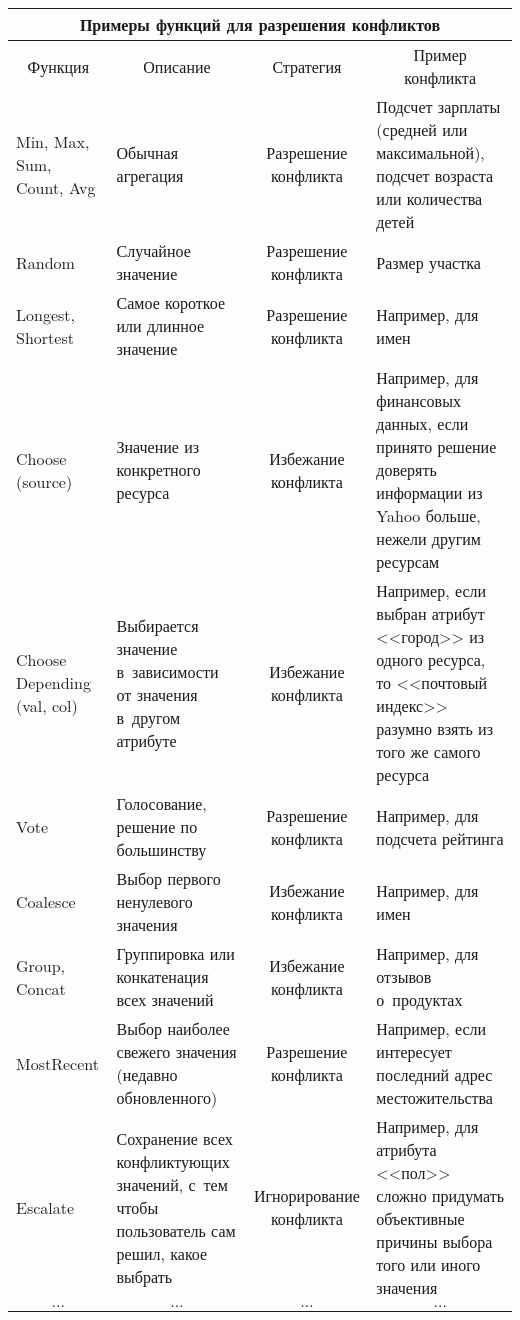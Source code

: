   \begin{table}\small
  \begin{center}

  \tabcolsep=5pt
  \begin{tabular}{|l|p{34mm}|c|p{40mm}|}
  \multicolumn{4}{c}{Примеры функций для разрешения конфликтов}\\[6pt]
  \hline
  \multicolumn{1}{|c|}{Функция}&\multicolumn{1}{c|}{Описание}&Стратегия&\multicolumn{1}{c|}{Пример
конфликта}\\
  \hline
Min, Max, Sum, Count, Avg&Обычная агрегация&Разрешение конфликта&Подсчет зарплаты
(средней или максимальной), подсчет возраста или количества детей\\
\hline
Random&Случайное значение&Разрешение конфликта&Размер участка\\
\hline
Longest, Shortest&Самое короткое или длинное значение&Разрешение
конфликта&Например, для имен\\
\hline
Choose (source)&Значение из конкретного ресурса&Избежание конфликта&Например, для
финансовых данных, если принято решение доверять информации из Yahoo больше, нежели
другим ресурсам\\
\hline
Choose Depending (val, col)&Выбирается значение в~зависимости от значения в~другом
атрибуте&Избежание конфликта&Например, если выбран атрибут <<город>> из одного
ресурса, то <<почтовый индекс>> разумно взять из того же самого ресурса\\
\hline
Vote&Голосование, решение по большинству&Разрешение конфликта&Например, для
подсчета рейтинга\\
\hline
Coalesce&Выбор первого ненулевого значения&Избежание конфликта&Например, для
имен\\
\hline
Group, Concat&Группировка или конкатенация всех значений&Избежание
конфликта&Например, для отзывов о~продуктах\\
\hline
MostRecent&Выбор наиболее свежего значения (недавно обновленного)&Разрешение
конфликта&Например, если интересует последний адрес местожительства\\
\hline
Escalate&Сохранение всех конфликтующих значений, с~тем чтобы пользователь сам решил,
какое выбрать&Игнорирование конфликта&Например, для атрибута <<пол>> сложно
придумать объективные причины выбора того или иного значения\\
\hline
\multicolumn{1}{|c|}{$\ldots$}&\multicolumn{1}{c|}{$\ldots$}&
\multicolumn{1}{|c|}{$\ldots$}&\multicolumn{1}{c|}{$\ldots$}\\
\hline
\end{tabular}
\end{center}
\end{table}

